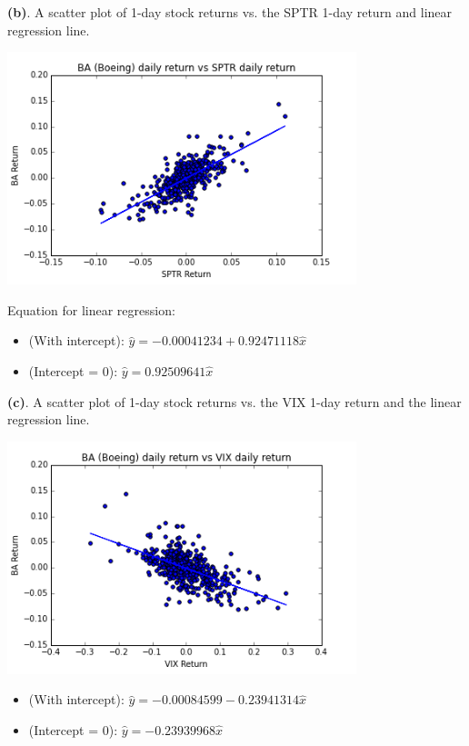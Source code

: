 \documentclass[11pt,letter]{article}
\begin{document}
\textbf{(b)}. A scatter plot of 1-day stock returns vs. the SPTR 1-day return and linear regression line.
\begin{center}
\includegraphics[width=4in,keepaspectratio]{1bBARetSPTRscatter}
\end{center}
Equation for linear regression:
\begin{itemize}
\item (With intercept): $ \hat{y} = -0.00041234 + 0.92471118 \hat{x}$
\item (Intercept = 0): $ \hat{y} = 0.92509641 \hat{x}$
\end{itemize}


\textbf{(c)}. A scatter plot of 1-day stock returns vs. the VIX 1-day return and the linear regression line.
\begin{center}
\includegraphics[width=4in,keepaspectratio]{1cBARetVIXscatter}
\end{center}
\begin{itemize}
\item (With intercept): $ \hat{y} = -0.00084599 -0.23941314 \hat{x}$
\item (Intercept = 0): $ \hat{y} = -0.23939968 \hat{x}$
\end{itemize}
\end{document}
